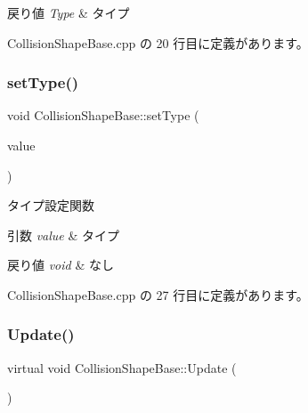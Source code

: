 \begin{DoxyRetVals}{戻り値}
{\em Type} & タイプ \\
\hline
\end{DoxyRetVals}


 Collision\+Shape\+Base.\+cpp の 20 行目に定義があります。

\mbox{\label{class_collision_shape_base_a82a91baac1983dab014be36864eecf54}} 
\subsubsection{\texorpdfstring{set\+Type()}{setType()}}
{\footnotesize\ttfamily void Collision\+Shape\+Base\+::set\+Type (\begin{DoxyParamCaption}\item[{\mbox{\hyperlink{class_collision_shape_base_a8abcef092855ad0ca191047044b002cb}{Collision\+Shape\+Base\+::\+Type}}}]{value }\end{DoxyParamCaption})}



タイプ設定関数 


\begin{DoxyParams}{引数}
{\em value} & タイプ \\
\hline
\end{DoxyParams}

\begin{DoxyRetVals}{戻り値}
{\em void} & なし \\
\hline
\end{DoxyRetVals}


 Collision\+Shape\+Base.\+cpp の 27 行目に定義があります。

\mbox{\label{class_collision_shape_base_a7aaa0f4de4e208f168f78e3445313929}} 
\subsubsection{\texorpdfstring{Update()}{Update()}}
{\footnotesize\ttfamily virtual void Collision\+Shape\+Base\+::\+Update (\begin{DoxyParamCaption}{ }\end{DoxyParamCaption})\hspace{0.3cm}{\ttfamily [pure virtual]}}



